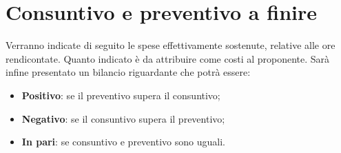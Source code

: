 %


\section{Consuntivo e preventivo a finire} %
\label{sec:consuntivo}
Verranno indicate di seguito le spese effettivamente sostenute, relative alle ore rendicontate. Quanto indicato è da attribuire come costi al proponente. \newline
Sarà infine presentato un bilancio riguardante che potrà essere:
	\begin{itemize}
		\item \textbf{Positivo}: se il preventivo supera il consuntivo;
		\item \textbf{Negativo}: se il consuntivo supera il preventivo;
		\item \textbf{In pari}: se consuntivo e preventivo sono uguali.
	\end{itemize}




